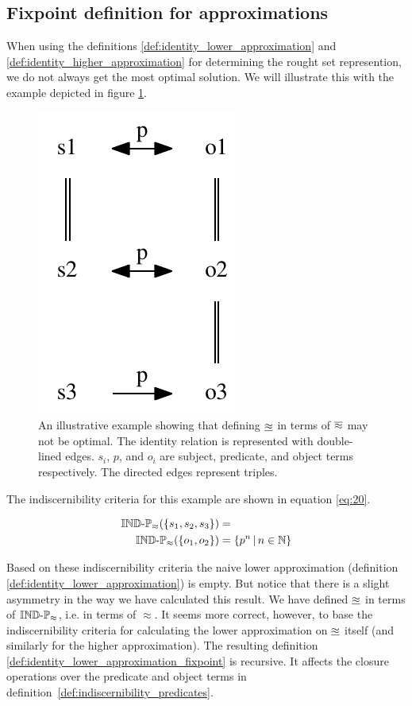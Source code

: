 \subsection{Fixpoint definition for approximations}

When using the definitions
  \ref{def:identity_lower_approximation} and
  \ref{def:identity_higher_approximation}
  for determining the rought set represention,
  we do not always get the most optimal solution.
We will illustrate this with the example depicted
  in figure \ref{fig:fixpoint}.

\begin{figure}
\label{fig:fixpoint}
\centering
\includegraphics[width=0.4\columnwidth]{./img/fixpoint_example_cropped}
\caption{
  An illustrative example showing that defining
  $\underline{\approx}$ in terms of $\overline{\approx}$ may not be optimal.
  The identity relation is represented with double-lined edges.
  $s_i$, $p$, and $o_i$ are subject, predicate, and object terms respectively.
  The directed edges represent triples.
}
\end{figure}

The indiscernibility criteria for this example are shown
  in equation \ref{eq:20}.

\begin{align}
\label{eq:20}
  \operatorname{{\mathbb{IND}-\mathbb{P}}}_{\approx}(\{s_1,s_2,s_3\})
&=\\
  \operatorname{{\mathbb{IND}-\mathbb{P}}}_{\approx}(\{o_1,o_2\})
&=
  \{p^n\,\vert\,n \in \mathbb{N}\}\nonumber
\end{align}

\noindent Based on these indiscernibility criteria
  the naive lower approximation
  (definition \ref{def:identity_lower_approximation}) is empty.
But notice that there is a slight asymmetry in the way we have
  calculated this result.
We have defined $\underline{\approx}$ in terms of $\operatorname{{\mathbb{IND}-\mathbb{P}}}_{\approx}$,
  i.e. in terms of $\approx$.
It seems more correct, however, to base the indiscernibility criteria
  for calculating the lower approximation on $\underline{\approx}$ itself
  (and similarly for the higher approximation).
The resulting definition \ref{def:identity_lower_approximation_fixpoint}
  is recursive.
It affects the closure operations over the predicate and object terms
  in \mbox{definition \ref{def:indiscernibility_predicates}}.

